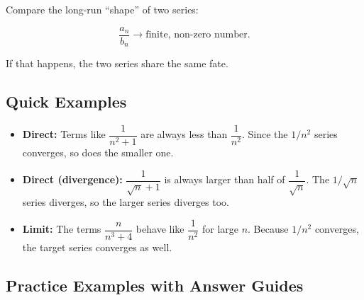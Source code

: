 \documentclass{article}
\begin{document}
\begin{tcolorbox}[colback=gray!8,colframe=black,title=Limit Comparison]
Compare the long-run “shape” of two series:

\[
\frac{a_n}{b_n} \longrightarrow \text{finite, non-zero number}.
\]

If that happens, the two series share the same fate.
\end{tcolorbox}

\subsection*{Quick Examples}

\begin{itemize}[itemsep=10pt]

  \item \textbf{Direct:}
        Terms like \(\dfrac{1}{n^{2}+1}\) are always less than
        \(\dfrac{1}{n^{2}}\).
        Since the \(1/n^{2}\) series converges, so does the smaller one.

  \item \textbf{Direct (divergence):}
        \(\dfrac{1}{\sqrt{n}+1}\) is always larger than half of \(\dfrac{1}{\sqrt{n}}\).
        The \(1/\sqrt{n}\) series diverges, so the larger series diverges too.

  \item \textbf{Limit:}
        The terms \(\dfrac{n}{n^{3}+4}\) behave like \(\dfrac{1}{n^{2}}\) for large \(n\).
        Because \(1/n^{2}\) converges, the target series converges as well.

\end{itemize}

\subsection*{Practice Examples with Answer Guides}
\end{document}
